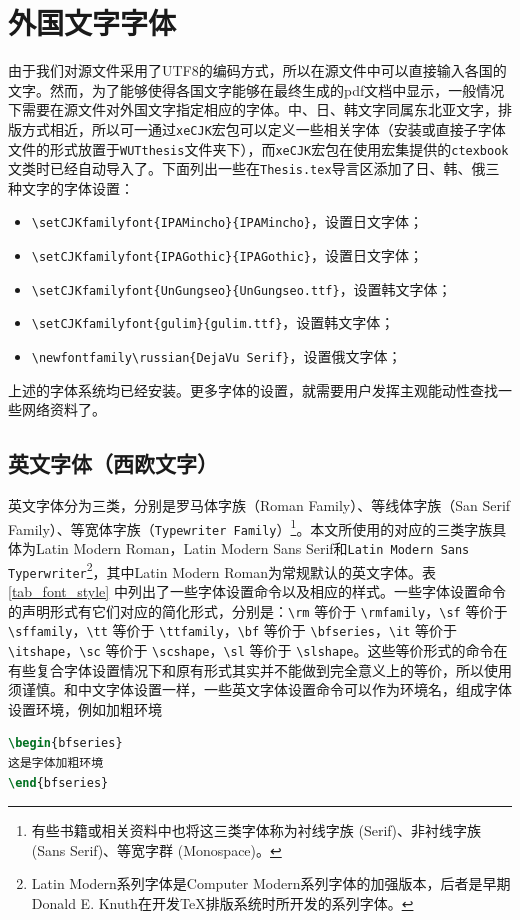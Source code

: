 \section{外国文字字体}

\par 由于我们对源文件采用了UTF8的编码方式，所以在源文件中可以直接输入各国的文字。然而，为了能够使得各国文字能够在最终生成的pdf文档中显示，一般情况下需要在源文件对外国文字指定相应的字体。中、日、韩文字同属东北亚文字，排版方式相近，所以可一通过\texttt{xeCJK}宏包可以定义一些相关字体（安装或直接子字体文件的形式放置于\texttt{WUTthesis}文件夹下），而\texttt{xeCJK}宏包在使用{\CTeX}宏集提供的\texttt{ctexbook}文类时已经自动导入了。下面列出一些在\texttt{Thesis.tex}导言区添加了日、韩、俄三种文字的字体设置：
\begin{itemize}
\item \verb"\setCJKfamilyfont{IPAMincho}{IPAMincho}"，设置日文字体；
\item \verb"\setCJKfamilyfont{IPAGothic}{IPAGothic}"，设置日文字体；
\item \verb"\setCJKfamilyfont{UnGungseo}{UnGungseo.ttf}"，设置韩文字体；
\item \verb"\setCJKfamilyfont{gulim}{gulim.ttf}"，设置韩文字体；
\item \verb"\newfontfamily\russian{DejaVu Serif}"，设置俄文字体；
\end{itemize}
上述的字体系统均已经安装。更多字体的设置，就需要用户发挥主观能动性查找一些网络资料了。


\subsection{英文字体（西欧文字）}
\par 英文字体分为三类，分别是罗马体字族（\textrm{Roman Family}）、等线体字族（\textsf{San Serif Family}）、等宽体字族（\texttt{Typewriter Family}）\footnote{有些书籍或相关资料中也将这三类字体称为衬线字族 (Serif)、非衬线字族 (Sans Serif)、等宽字群 (Monospace)。}。本文所使用的对应的三类字族具体为Latin Modern Roman，\textsf{Latin Modern Sans Serif}和\texttt{Latin Modern Sans Typerwriter}\footnote{Latin Modern系列字体是Computer Modern系列字体的加强版本，后者是早期Donald E. Knuth在开发{\TeX}排版系统时所开发的系列字体。}，其中Latin Modern Roman为常规默认的英文字体。表 \ref{tab_font_style} 中列出了一些字体设置命令以及相应的样式。一些字体设置命令的声明形式有它们对应的简化形式，分别是：\verb"\rm" 等价于 \verb"\rmfamily"，\verb"\sf" 等价于 \verb"\sffamily"，\verb"\tt" 等价于 \verb"\ttfamily"，\verb"\bf" 等价于 \verb"\bfseries"，\verb"\it" 等价于 \verb"\itshape"，\verb"\sc" 等价于 \verb"\scshape"，\verb"\sl" 等价于 \verb"\slshape"。这些等价形式的命令在有些复合字体设置情况下和原有形式其实并不能做到完全意义上的等价，所以使用须谨慎。和中文字体设置一样，一些英文字体设置命令可以作为环境名，组成字体设置环境，例如加粗环境
\begin{lstlisting}[language=TeX]
\begin{bfseries}
这是字体加粗环境
\end{bfseries}
\end{lstlisting}




